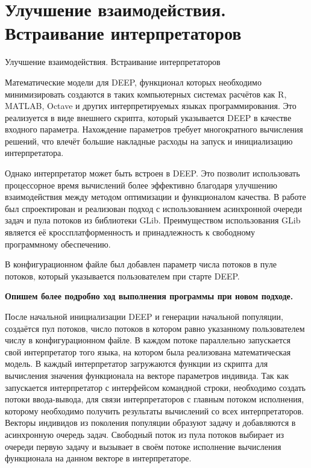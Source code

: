 \section*{Улучшение взаимодействия.\\Встраивание интерпретаторов}
{Улучшение взаимодействия. Встраивание интерпретаторов}

Математические модели для DEEP,
функционал которых необходимо минимизировать
создаются в таких компьютерных системах расчётов
как R, MATLAB, Octave
и других интерпретируемых языках программирования.
Это реализуется в виде внешнего скрипта,
который указывается DEEP в качестве входного параметра.
Нахождение параметров требует
многократного вычисления решений,
что влечёт большие накладные расходы
на запуск и инициализацию интерпретатора.

Однако интерпретатор может быть встроен в DEEP.
Это позволит использовать процессорное время вычислений
более эффективно благодаря
улучшению взаимодействия между
методом оптимизации и
функционалом качества.
В работе был спроектирован и реализован
подход с использованием
асинхронной очереди задач и пула потоков
из библиотеки GLib.
Преимуществом использования GLib
является её кроссплатформенность
и принадлежность к свободному программному обеспечению.

В конфигурационном файле был добавлен
параметр числа потоков в пуле потоков,
который указывается пользователем
при старте DEEP.

\textbf{Опишем более подробно ход выполнения программы
при новом подходе.}

После начальной инициализации DEEP
и генерации начальной популяции,
создаётся пул потоков,
число потоков в котором равно
указанному пользователем числу в
конфигурационном файле.
В каждом потоке параллельно
запускается свой интерпретатор того языка,
на котором была реализована математическая модель.
В каждый интерпретатор загружаются
функции из скрипта
для вычисления значения функционала
на векторе параметров индивида.
Так как запускается интерпретатор
с интерфейсом командной строки,
необходимо создать потоки ввода-вывода,
для связи интерпретаторов
с главным потоком исполнения,
которому необходимо получить
результаты вычислений со всех интерпретаторов.
Векторы индивидов из поколения популяции
образуют задачу и
добавляются в асинхронную очередь задач.
Свободный поток из пула потоков
выбирает из очереди первую задачу
и вызывает в своём потоке
исполнение вычисления функционала
на данном векторе в интерпретаторе.

